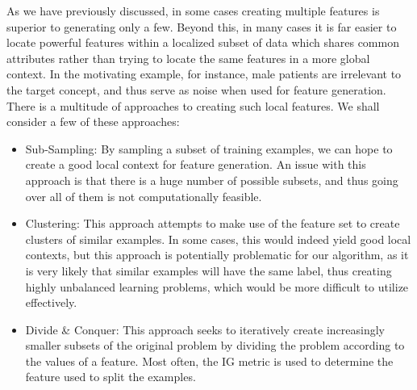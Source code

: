 \documentclass[twoside,11pt]{article}
\theoremstyle{definition}
\begin{document}
As we have previously discussed, in some cases creating multiple features is superior to generating only a few. Beyond this, in many cases it is far easier to locate powerful features within a localized subset of data which shares common attributes rather than trying to locate the same features in a more global context. In the motivating example, for instance, male patients are irrelevant to the target concept, and thus serve as noise when used for feature generation.
There is a multitude of approaches to creating such local features. We shall consider a few of these approaches:
\begin{itemize}
	\item Sub-Sampling: By sampling a subset of training examples, we can hope to create a good local context for feature generation. An issue with this approach is that there is a huge number of possible subsets, and thus going over all of them is not computationally feasible. 
	\item Clustering: This approach attempts to make use of the feature set to create clusters of similar examples. In some cases, this would indeed yield good local contexts, but this approach is potentially problematic for our algorithm, as it is very likely that similar examples will have the same label, thus creating highly unbalanced learning problems, which would be more difficult to utilize effectively.
	\item Divide \& Conquer: This approach seeks to iteratively create increasingly smaller subsets of the original problem by dividing the problem according to the values of a feature. Most often, the IG metric is used to determine the feature used to split the examples.
\end{itemize}
\end{document}
